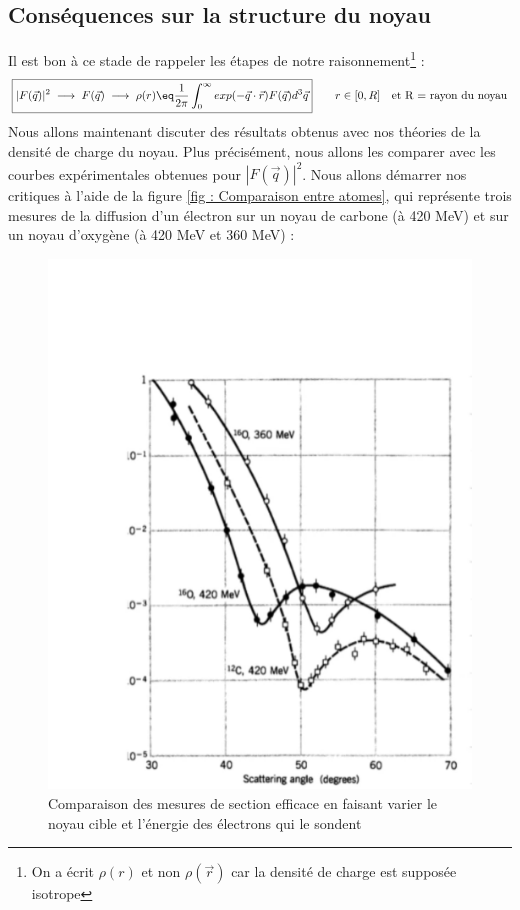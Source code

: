     \subsection{Conséquences sur la structure du noyau}


Il est bon à ce stade de rappeler les étapes de notre raisonnement\footnote{On a écrit $\rho(r)$ et non $\rho(\vec{r})$ car la densité de charge est supposée isotrope} : 
\begin{equation*}
\boxed{
    |F(\vec{q})|^2 \; \longrightarrow \; F(\vec{q}) \; \longrightarrow \; \rho(r) \eq \frac{1}{2\pi} \int_0^{\infty} exp(-\vec{q}\cdot \vec{r})
    F(\vec{q}) d^3\vec{q}
}
    \qquad r \in [0,R] \quad \text{et R = rayon du noyau}
\end{equation*}
Nous allons maintenant discuter des résultats obtenus avec nos théories de la densité de charge du noyau. Plus précisément, nous allons les comparer avec les courbes expérimentales obtenues pour $|F(\vec{q})|^2$. Nous allons démarrer nos critiques à l'aide de la figure \eqref{fig : Comparaison entre atomes}, qui représente trois mesures de la diffusion d'un électron sur un noyau de carbone (à 420 MeV) et sur un noyau d'oxygène (à 420 MeV et 360 MeV) :
\begin{figure}[H]
    \centering
    \includegraphics[scale=0.80]{Images4/ComparaisonAtomes.PNG}
    \caption{Comparaison des mesures de section efficace en faisant varier le noyau cible et l'énergie des électrons qui le sondent}
    \label{fig : Comparaison entre atomes}
\end{figure}


